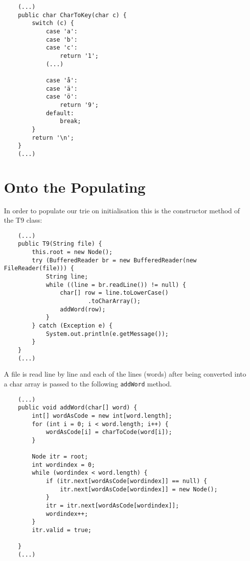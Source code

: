 \documentclass[a4paper,11pt]{article}
\begin{document}
\begin{verbatim}
    (...)
    public char CharToKey(char c) {
        switch (c) {
            case 'a':
            case 'b':
            case 'c':
                return '1';
            (...)
            
            case 'å':
            case 'ä':
            case 'ö':
                return '9';
            default:
                break;
        }
        return '\n';
    }
    (...)
\end{verbatim}

\section*{Onto the Populating}

In order to populate our trie on initialisation this is the constructor method of the T9 class:

\begin{verbatim}
    (...)
    public T9(String file) {
        this.root = new Node(); 
        try (BufferedReader br = new BufferedReader(new FileReader(file))) {
            String line;
            while ((line = br.readLine()) != null) {
                char[] row = line.toLowerCase()
                        .toCharArray();
                addWord(row);
            }
        } catch (Exception e) {
            System.out.println(e.getMessage());
        }
    }
    (...)
\end{verbatim}

A file is read line by line and each of the lines (words) after being converted into a char array is passed to the following {\tt addWord} method.

\begin{verbatim}
    (...)
    public void addWord(char[] word) {
        int[] wordAsCode = new int[word.length];
        for (int i = 0; i < word.length; i++) {
            wordAsCode[i] = charToCode(word[i]);
        }

        Node itr = root;
        int wordindex = 0;
        while (wordindex < word.length) {
            if (itr.next[wordAsCode[wordindex]] == null) {
                itr.next[wordAsCode[wordindex]] = new Node();
            }
            itr = itr.next[wordAsCode[wordindex]];
            wordindex++;
        }
        itr.valid = true;

    }
    (...)
\end{verbatim}
\end{document}
